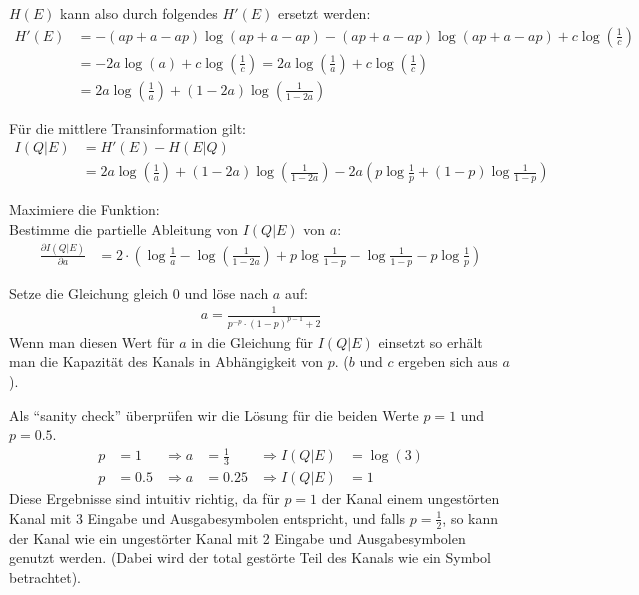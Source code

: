 \begin{myList}
$H(E)$ kann also durch folgendes $H'(E)$ ersetzt werden:
\begin{align*}
	H'(E) &= -(ap + a - ap)\log(ap + a - ap) -(ap + a - ap)\log(ap + a - ap) + c \log \left(\frac{1}{c} \right)\\
	&= -2a\log(a) + c \log \left(\frac{1}{c} \right) = 2 a\log \left( \frac{1}{a}\right) + c \log \left(\frac{1}{c} \right) \\
	&= 2 a\log \left( \frac{1}{a}\right) + (1-2a) \log \left(\frac{1}{1 - 2a} \right)
\end{align*}

Für die mittlere Transinformation gilt:
\begin{align*}
	I(Q|E) &= H'(E) - H(E|Q) \\
	&= 2 a\log \left( \frac{1}{a}\right) + (1-2a) \log \left(\frac{1}{1 - 2a} \right) - 2a\left(p\log \frac{1}{p} + (1-p) \log \frac{1}{1-p} \right)
\end{align*}

Maximiere die Funktion:\\
Bestimme die partielle Ableitung von $I(Q|E)$ von $a$:
\begin{align*}
	\frac{\partial I(Q|E)}{\partial a} &= 2 \cdot \left( \log \frac{1}{a} - \log(\frac{1}{1-2a}) + p\log \frac{1}{1-p} - \log \frac{1}{1-p} - p \log \frac{1}{p} \right)
\end{align*}

Setze die Gleichung gleich $0$ und löse nach $a$ auf:
\begin{align*}
	a = \frac{1}{p^{-p} \cdot (1-p)^{p-1} + 2}
\end{align*}
Wenn man diesen Wert für $a$ in die Gleichung für $I(Q|E)$ einsetzt so erhält man die Kapazität des Kanals in Abhängigkeit von $p$.
($b$ und $c$ ergeben sich aus $a$).

Als \enquote{sanity check} überprüfen wir die Lösung für die beiden Werte $p = 1$ und $p = 0.5$.
\begin{align*}
	p &= 1  &\Rightarrow a &= \frac{1}{3} &\Rightarrow I(Q|E) &= \log(3) \\
	p &= 0.5 &\Rightarrow a &= 0.25 &\Rightarrow I(Q|E) &= 1
\end{align*}
Diese Ergebnisse sind intuitiv richtig, da für $p = 1$ der Kanal einem ungestörten Kanal mit 3 Eingabe und Ausgabesymbolen entspricht, und falls $p = \frac{1}{2}$, so kann der Kanal wie ein ungestörter Kanal mit 2 Eingabe und Ausgabesymbolen genutzt werden.
(Dabei wird der total gestörte Teil des Kanals wie ein Symbol betrachtet).
\end{myList}

